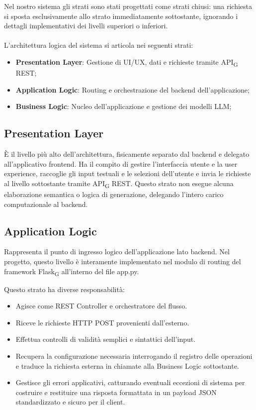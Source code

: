 \documentclass[11pt,a4paper]{article}
\newcommand{\gls}[1]{#1\textsubscript{G}}
\begin{document}
Nel nostro sistema gli strati sono stati progettati come strati chiusi: una richiesta si sposta esclusivamente allo strato immediatamente sottostante, ignorando i dettagli implementativi dei livelli superiori o inferiori.
\\ \\
L'architettura logica del sistema si articola nei seguenti strati:
\begin{itemize}
   \item \textbf{Presentation Layer}: Gestione di UI/UX, dati e richieste tramite \gls{API} REST;
   \item \textbf{Application Logic}: Routing e orchestrazione del backend dell'applicazione;
    \item \textbf{Business Logic}: Nucleo dell'applicazione e gestione dei modelli LLM;
\end{itemize}
\subsection{Presentation Layer}
È il livello più alto dell'architettura, fisicamente separato dal backend e delegato all'applicativo frontend. Ha il compito di gestire l'interfaccia utente e la user experience, raccoglie gli input testuali e le selezioni dell'utente e invia le richieste al livello sottostante tramite \gls{API} REST. Questo strato non esegue alcuna elaborazione semantica o logica di generazione, delegando l'intero carico computazionale al backend.

\subsection{Application Logic}
Rappresenta il punto di ingresso logico dell'applicazione lato backend. Nel progetto, questo livello è interamente implementato nel modulo di routing del framework \gls{Flask} all'interno del file app.py. 

Questo strato ha diverse responsabilità:
\begin{itemize}
    \item Agisce come REST Controller e orchestratore del flusso.
    \item Riceve le richieste HTTP POST provenienti dall'esterno.
    \item Effettua controlli di validità semplici e sintattici dell'input.
    \item Recupera la configurazione necessaria interrogando il registro delle operazioni e traduce la richiesta esterna in chiamate alla Business Logic sottostante.
    \item Gestisce gli errori applicativi, catturando eventuali eccezioni di sistema per costruire e restituire una risposta formattata in un payload JSON standardizzato e sicuro per il client.
\end{itemize}
\end{document}
